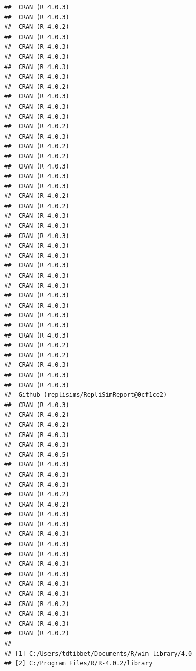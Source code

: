 \documentclass[10,a4paperpaper,]{article}
\begin{document}
\begin{verbatim}
##  CRAN (R 4.0.3)                           
##  CRAN (R 4.0.3)                           
##  CRAN (R 4.0.2)                           
##  CRAN (R 4.0.3)                           
##  CRAN (R 4.0.3)                           
##  CRAN (R 4.0.3)                           
##  CRAN (R 4.0.3)                           
##  CRAN (R 4.0.3)                           
##  CRAN (R 4.0.2)                           
##  CRAN (R 4.0.3)                           
##  CRAN (R 4.0.3)                           
##  CRAN (R 4.0.3)                           
##  CRAN (R 4.0.2)                           
##  CRAN (R 4.0.3)                           
##  CRAN (R 4.0.2)                           
##  CRAN (R 4.0.2)                           
##  CRAN (R 4.0.3)                           
##  CRAN (R 4.0.3)                           
##  CRAN (R 4.0.3)                           
##  CRAN (R 4.0.2)                           
##  CRAN (R 4.0.2)                           
##  CRAN (R 4.0.3)                           
##  CRAN (R 4.0.3)                           
##  CRAN (R 4.0.3)                           
##  CRAN (R 4.0.3)                           
##  CRAN (R 4.0.3)                           
##  CRAN (R 4.0.3)                           
##  CRAN (R 4.0.3)                           
##  CRAN (R 4.0.3)                           
##  CRAN (R 4.0.3)                           
##  CRAN (R 4.0.3)                           
##  CRAN (R 4.0.3)                           
##  CRAN (R 4.0.3)                           
##  CRAN (R 4.0.3)                           
##  CRAN (R 4.0.2)                           
##  CRAN (R 4.0.2)                           
##  CRAN (R 4.0.3)                           
##  CRAN (R 4.0.3)                           
##  CRAN (R 4.0.3)                           
##  Github (replisims/RepliSimReport@0cf1ce2)
##  CRAN (R 4.0.3)                           
##  CRAN (R 4.0.2)                           
##  CRAN (R 4.0.2)                           
##  CRAN (R 4.0.3)                           
##  CRAN (R 4.0.3)                           
##  CRAN (R 4.0.5)                           
##  CRAN (R 4.0.3)                           
##  CRAN (R 4.0.3)                           
##  CRAN (R 4.0.3)                           
##  CRAN (R 4.0.2)                           
##  CRAN (R 4.0.2)                           
##  CRAN (R 4.0.3)                           
##  CRAN (R 4.0.3)                           
##  CRAN (R 4.0.3)                           
##  CRAN (R 4.0.3)                           
##  CRAN (R 4.0.3)                           
##  CRAN (R 4.0.3)                           
##  CRAN (R 4.0.3)                           
##  CRAN (R 4.0.3)                           
##  CRAN (R 4.0.3)                           
##  CRAN (R 4.0.2)                           
##  CRAN (R 4.0.3)                           
##  CRAN (R 4.0.3)                           
##  CRAN (R 4.0.2)                           
## 
## [1] C:/Users/tdtibbet/Documents/R/win-library/4.0
## [2] C:/Program Files/R/R-4.0.2/library
\end{verbatim}
\end{document}
